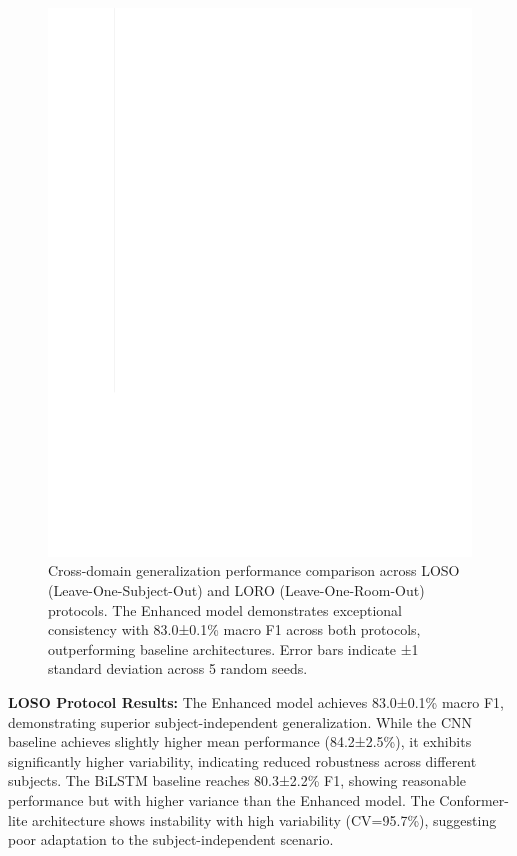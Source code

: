 \documentclass[journal]{IEEEtran}
\begin{document}
\begin{figure}[ht]
\centering
\includegraphics[width=\columnwidth]{figures/figure3_cdae_basic.pdf}
\caption{Cross-domain generalization performance comparison across LOSO (Leave-One-Subject-Out) and LORO (Leave-One-Room-Out) protocols. The Enhanced model demonstrates exceptional consistency with 83.0±0.1\% macro F1 across both protocols, outperforming baseline architectures. Error bars indicate ±1 standard deviation across 5 random seeds.}
\label{fig:cross_domain}
\end{figure}

\textbf{LOSO Protocol Results:} The Enhanced model achieves 83.0±0.1\% macro F1, demonstrating superior subject-independent generalization. While the CNN baseline achieves slightly higher mean performance (84.2±2.5\%), it exhibits significantly higher variability, indicating reduced robustness across different subjects. The BiLSTM baseline reaches 80.3±2.2\% F1, showing reasonable performance but with higher variance than the Enhanced model. The Conformer-lite architecture shows instability with high variability (CV=95.7\%), suggesting poor adaptation to the subject-independent scenario.
\end{document}
